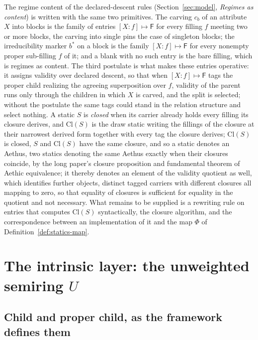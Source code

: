 The regime content of the declared-descent rules (Section~\ref{sec:model}, \textit{Regimes as content}) is written with the same two primitives. The carving $c_b$ of an attribute $X$ into blocks is the family of entries $[X : f] \mapsto \mathsf{F}$ for every filling $f$ meeting two or more blocks, the carving into single pins the case of singleton blocks; the irreducibility marker $b^{*}$ on a block is the family $[X : f] \mapsto \mathsf{F}$ for every nonempty proper sub-filling $f$ of it; and a blank with no such entry is the bare filling, which is regimes as content. The third postulate is what makes these entries operative: it assigns validity over declared descent, so that when $[X : f] \mapsto \mathsf{F}$ tags the proper child realizing the agreeing superposition over $f$, validity of the parent runs only through the children in which $X$ is carved, and the split is selected; without the postulate the same tags could stand in the relation structure and select nothing. A static $S$ is \emph{closed} when its carrier already holds every filling its closure derives, and $\mathrm{Cl}(S)$ is the draw static writing the fillings of the closure at their narrowest derived form together with every tag the closure derives; $\mathrm{Cl}(S)$ is closed, $S$ and $\mathrm{Cl}(S)$ have the same closure, and so a static denotes an Aethus, two statics denoting the same Aethus exactly when their closures coincide, by the long paper's closure proposition and fundamental theorem of Aethic equivalence; it thereby denotes an element of the validity quotient as well, which identifies further objects, distinct tagged carriers with different closures all mapping to zero, so that equality of closures is sufficient for equality in the quotient and not necessary. What remains to be supplied is a rewriting rule on entries that computes $\mathrm{Cl}(S)$ syntactically, the closure algorithm, and the correspondence between an implementation of it and the map $\Phi$ of Definition~\ref{def:statics-map}.

\section{The intrinsic layer: the unweighted semiring $U$}

\subsection{Child and proper child, as the framework defines them}\label{sec:child-proper-child}

